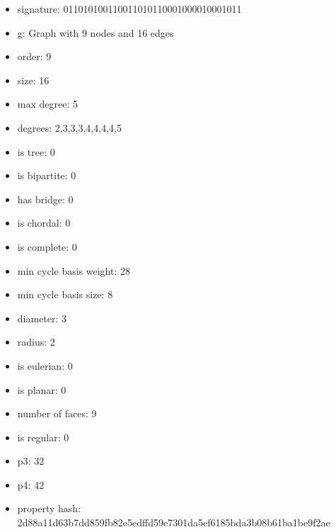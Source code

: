 \newpage
\begin{figure}
\end{figure}
\begin{itemize}
\item signature: 011010100110011010110001000010001011
\item g: Graph with 9 nodes and 16 edges
\item order: 9
\item size: 16
\item max degree: 5
\item degrees: 2,3,3,3,4,4,4,4,5
\item is tree: 0
\item is bipartite: 0
\item has bridge: 0
\item is chordal: 0
\item is complete: 0
\item min cycle basis weight: 28
\item min cycle basis size: 8
\item diameter: 3
\item radius: 2
\item is eulerian: 0
\item is planar: 0
\item number of faces: 9
\item is regular: 0
\item p3: 32
\item p4: 42
\item property hash: 2d88a11d63b7dd859fb82e5edffd59e7301da5ef6185bda3b08b61ba1be9f2ae
\end{itemize}
